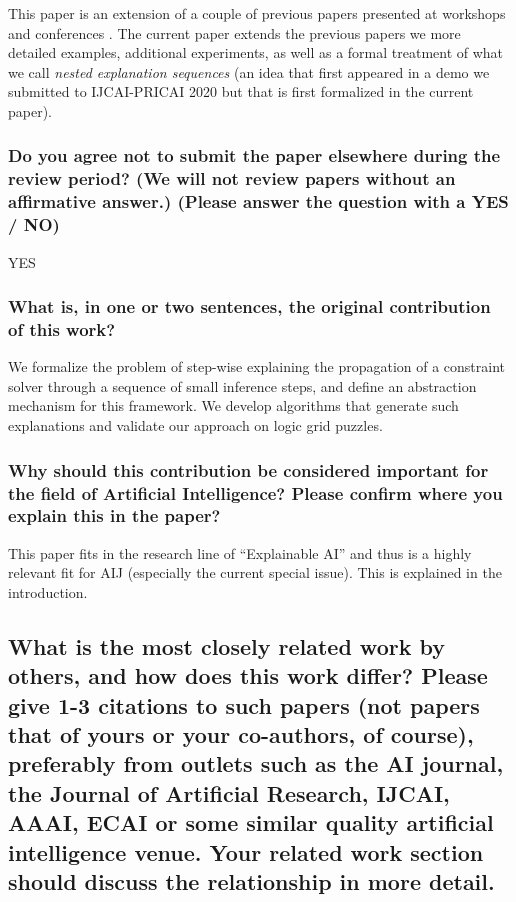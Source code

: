 \documentclass{article}
\begin{document}
This paper is an extension of a couple of previous papers presented at workshops and conferences \cite{claesuser,DBLP:conf/bnaic/ClaesBCGG19,ecai/BogaertsGCG20}. The current paper extends the previous papers we more detailed examples, additional experiments, as well as a formal treatment of what we call \emph{nested explanation sequences} (an idea that first appeared in a demo we submitted to IJCAI-PRICAI 2020 but that is first formalized in the current paper).  




\subsubsection*{Do you agree not to submit the paper elsewhere during the review period? (We will not review papers without an affirmative answer.) (Please answer the question with a YES / NO)}

YES


\subsubsection*{What is, in one or two sentences, the original contribution of this work?}

We formalize the problem of step-wise explaining the propagation of a constraint solver through a sequence of small inference steps, and define an abstraction mechanism for this framework. 
We develop algorithms that generate such explanations and validate our approach on logic grid puzzles. 


\subsubsection*{Why should this contribution be considered important for the field of Artificial Intelligence? Please confirm where you explain this in the paper?}

This paper fits in the research line of ``Explainable AI'' and thus is a highly relevant fit for AIJ (especially the current special issue). This is explained in the introduction. 


\subsection*{What is the most closely related work by others, and how does this work differ? Please give 1-3 citations to such papers (not papers that of yours or your co-authors, of course), preferably from outlets such as the AI journal, the Journal of Artificial Research, IJCAI, AAAI, ECAI or some similar quality artificial intelligence venue. Your related work section should discuss the relationship in more detail.}
\end{document}
